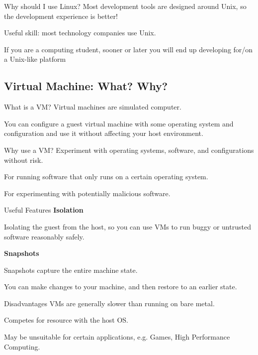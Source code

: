 \documentclass[12pt]{beamer}
\begin{document}
\begin{frame}{Why should I use Linux?}
  Most development tools are designed around Unix, so the development experience is better!

  Useful skill: most technology companies use Unix.

  If you are a computing student, sooner or later you will end up developing for/on a Unix-like platform
\end{frame}

\subsection{Virtual Machine: What? Why?}
\begin{frame}{What is a VM?}
  Virtual machines are simulated computer.

  You can configure a guest virtual machine with some operating system and configuration and use it without affecting your host environment.
\end{frame}

\begin{frame}{Why use a VM?}
  Experiment with operating systems, software, and configurations without risk.

  For running software that only runs on a certain operating system.

  For experimenting with potentially malicious software.
\end{frame}

\begin{frame}{Useful Features}
  \textbf{Isolation}

  Isolating the guest from the host, so you can use VMs to run buggy or untrusted software reasonably safely.

  \textbf{Snapshots}

  Snapshots capture the entire machine state.

  You can make changes to your machine, and then restore to an earlier state.

\end{frame}

\begin{frame}{Disadvantages}
  VMs are generally slower than running on bare metal.

  Competes for resource with the host OS.

  May be unsuitable for certain applications, e.g. Games, High Performance Computing.
\end{frame}
\end{document}
